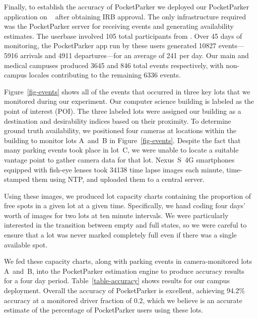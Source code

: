 Finally, to establish the accuracy of PocketParker we deployed our PocketParker
application on \PhoneLab{}~\cite{phonelab-testbed} after obtaining IRB approval. The only
infrastructure required was the PocketParker server for receiving events and
generating availability estimates. The userbase involved 105 total participants
from \PhoneLab{}.  Over 45 days of monitoring, the PocketParker app  run by
these users
generated \num{10827} events---5916 arrivals and 4911 departures---for an
average of 241 per day. Our main and medical campuses produced 3645 and 846
total events respectively, with non-campus locales contributing to the
remaining 6336 events.

Figure~\ref{fig-events} shows all of the events that occurred in three key
lots that we monitored during our experiment. Our computer science building
is labeled as the point of interest (POI). The three labeled lots were
assigned our building as a destination and desirability indices based on
their proximity. To determine ground truth availability, we positioned four
cameras at locations within the building to monitor lots A~and~B in
Figure~\ref{fig-events}. Despite the fact that many parking events took place
in lot~C, we were unable to locate a suitable vantage point to gather camera
data for that lot. Nexus~S~4G smartphones equipped with fish-eye lenses took
\num{34138} time lapse images each minute, time-stamped them using NTP, and
uploaded them to a central server.

Using these images, we produced lot capacity charts containing the proportion
of free spots in a given lot at a given time. Specifically, we hand coding four
days' worth of images for two lots at ten minute intervals. We were
particularly interested in the transition between empty and full states, so we
were careful to ensure that a lot was never marked completely full even if
there was a single available spot.

We fed these capacity charts, along with parking events in camera-monitored
lots A~and~B, into the PocketParker estimation engine to produce accuracy
results for a four day period.  Table~\ref{table-accuracy} shows results for
our campus deployment. Overall the accuracy of PocketParker is excellent,
achieving 94.2\% accuracy at a monitored driver fraction of 0.2, which we
believe is an accurate estimate of the percentage of PocketParker users using
these lots.

